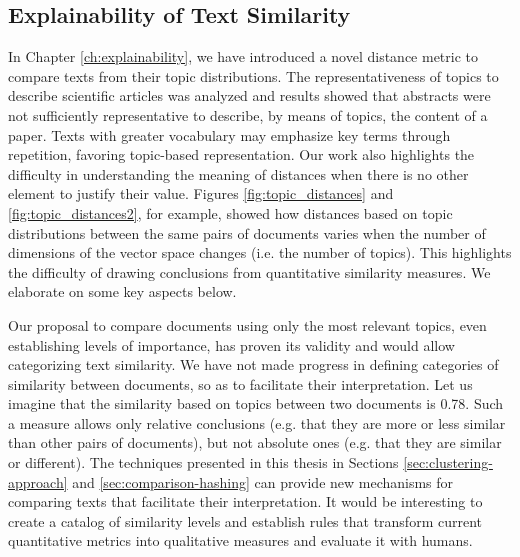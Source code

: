 \subsection{Explainability of Text Similarity}

In Chapter \ref{ch:explainability}, we have introduced a novel distance metric to compare texts from their topic distributions. The representativeness of topics to describe scientific articles was analyzed and results showed that abstracts were not sufficiently representative to describe, by means of topics, the content of a paper. Texts with greater vocabulary may emphasize key terms through repetition, favoring topic-based representation. Our work also highlights the difficulty in understanding the meaning of distances when there is no other element to justify their value. Figures \ref{fig:topic_distances} and \ref{fig:topic_distances2}, for example, showed how distances based on topic distributions between the same pairs of documents varies when the number of dimensions of the vector space changes (i.e. the number of topics). This highlights the difficulty of drawing conclusions from quantitative similarity measures. We elaborate on some key aspects below.

Our proposal to compare documents using only the most relevant topics, even establishing levels of importance, has proven its validity and would allow categorizing text similarity. We have not made progress in defining categories of similarity between documents, so as to facilitate their interpretation. Let us imagine that the similarity based on topics between two documents is 0.78. Such a measure allows only relative conclusions (e.g. that they are more or less similar than other pairs of documents), but not absolute ones (e.g. that they are similar or different). The techniques presented in this thesis in Sections \ref{sec:clustering-approach} and \ref{sec:comparison-hashing} can provide new mechanisms for comparing texts that facilitate their interpretation. It would be interesting to create a catalog of similarity levels and establish rules that transform current quantitative metrics into qualitative measures and evaluate it  with humans.
  

